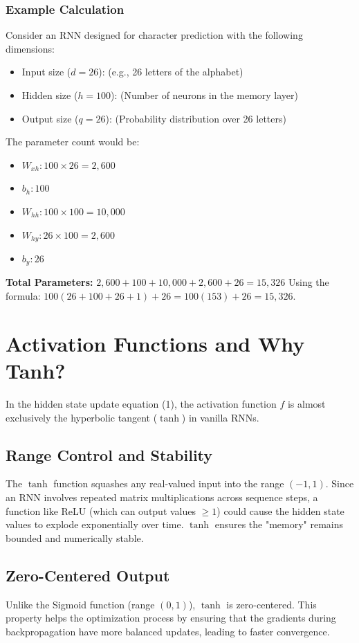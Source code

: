 \documentclass{article}
\begin{document}
\subsubsection*{Example Calculation}
Consider an RNN designed for character prediction with the following dimensions:
\begin{itemize}
    \item Input size ($d = 26$): (e.g., 26 letters of the alphabet)
    \item Hidden size ($h = 100$): (Number of neurons in the memory layer)
    \item Output size ($q = 26$): (Probability distribution over 26 letters)
\end{itemize}

The parameter count would be:
\begin{itemize}
    \item $W_{xh}: 100 \times 26 = 2,600$
    \item $b_h: 100$
    \item $W_{hh}: 100 \times 100 = 10,000$
    \item $W_{hy}: 26 \times 100 = 2,600$
    \item $b_y: 26$
\end{itemize}
\textbf{Total Parameters:} $2,600 + 100 + 10,000 + 2,600 + 26 = 15,326$
Using the formula: $100(26 + 100 + 26 + 1) + 26 = 100(153) + 26 = 15,326$.

\section{Activation Functions and Why Tanh?}
In the hidden state update equation (1), the activation function $f$ is almost exclusively the hyperbolic tangent ($\tanh$) in vanilla RNNs.

\subsection{Range Control and Stability}
The $\tanh$ function squashes any real-valued input into the range $(-1, 1)$. Since an RNN involves repeated matrix multiplications across sequence steps, a function like ReLU (which can output values $\geq 1$) could cause the hidden state values to explode exponentially over time. $\tanh$ ensures the "memory" remains bounded and numerically stable.

\subsection{Zero-Centered Output}
Unlike the Sigmoid function (range $(0, 1)$), $\tanh$ is zero-centered. This property helps the optimization process by ensuring that the gradients during backpropagation have more balanced updates, leading to faster convergence.
\end{document}
